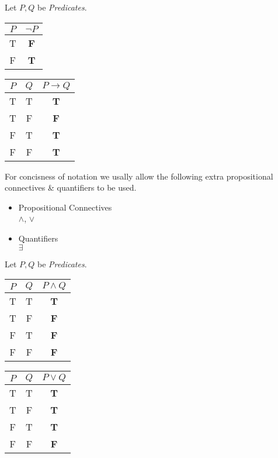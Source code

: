 \documentclass[11pt,a4paper]{article}
\begin{document}

Let $P,Q$ be \textit{Predicates}.
\begin{center}
\begin{tabular}{c|c}
$P$&$\neg P$\\
\hline T&\textbf{F}\\
F&\textbf{T}
\end{tabular}
\quad
\begin{tabular}{c|c|c}
$P$&$Q$&$P\to Q$\\
\hline T&T&\textbf{T}\\
T&F&\textbf{F}\\
F&T&\textbf{T}\\
F&F&\textbf{T}
\end{tabular}
\end{center}

For concisness of notation we usally allow the following extra propositional connectives \& quantifiers to be used.
\begin{itemize}
	\item Propositional Connectives\\
	$\wedge$, $\vee$
	\item Quantifiers\\
	$\exists$
\end{itemize}

Let $P,Q$ be \textit{Predicates}.
\begin{center}
\begin{tabular}{c|c|c}
$P$&$Q$&$P\wedge Q$\\
\hline T&T&\textbf{T}\\
T&F&\textbf{F}\\
F&T&\textbf{F}\\
F&F&\textbf{F}
\end{tabular}
\quad
\begin{tabular}{c|c|c}
$P$&$Q$&$P\vee Q$\\
\hline T&T&\textbf{T}\\
T&F&\textbf{T}\\
F&T&\textbf{T}\\
F&F&\textbf{F}
\end{tabular}
\end{center}

\end{document}
